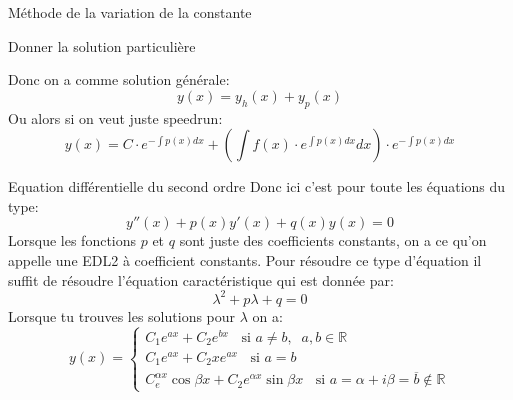 \begin{parag}{Méthode de la variation de la constante}
\begin{subparag}{Donner la solution particulière}
    \end{subparag}
    Donc on a comme solution générale:
    \begin{equation*} y\left(x\right) = y_h\left(x\right) + y_p\left(x\right) \end{equation*}
    Ou alors si on veut juste speedrun:
    \begin{equation*} y\left(x\right) = C\cdot e^{-\int p\left(x\right) dx} + \left(\int f\left(x\right) \cdot  e^{\int p\left(x\right) dx}dx\right) \cdot  e^{-\int p\left(x\right) dx} \end{equation*}
    
\end{parag}
\begin{parag}{Equation différentielle du second ordre}
    Donc ici c'est pour toute les équations du type:
   \begin{equation*} y''\left(x\right) + p\left(x\right)y'\left(x\right) + q\left(x\right)y\left(x\right) = 0 \end{equation*} 
  Lorsque les fonctions $p$ et $q$ sont juste des coefficients constants, on a ce qu'on appelle une EDL2 à coefficient constants. Pour résoudre ce type d'équation il suffit de résoudre l'équation caractéristique qui est donnée par:
  \begin{equation*} \lambda^2 + p\lambda + q = 0 \end{equation*}
  Lorsque tu trouves les solutions pour $\lambda$ on a:
  \begin{equation*} y\left(x\right) = \begin{cases} C_1e^{ax} + C_2 e^{bx} \; \; \text{ si } a \neq b, \; \; a, b \in \mathbb{R} \\
      C_1e^{ax} + C_2xe^{ax} \; \; \text{ si } a = b\\
  C_e^{\alpha x}\cos \beta x + C_2e^{\alpha x} \sin \beta x \; \; \text{ si } a = \alpha + i \beta = \overline{b} \notin \mathbb{R} \end{cases}
  \end{equation*}
\end{parag}
